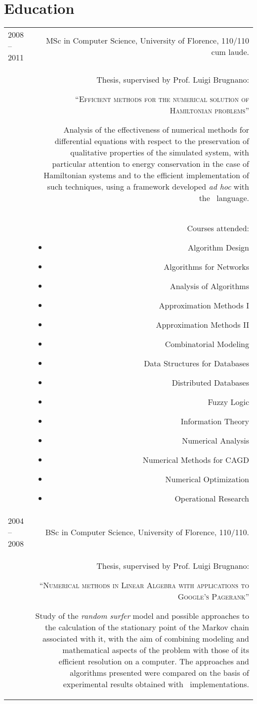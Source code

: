 \documentclass[10pt]{article}
\begin{document}
\section*{Education}
\begin{longtable}{L!{\VRule}R}
2008 -- 2011 & MSc in Computer Science, University of Florence, 110/110 cum laude.\\[5pt]
    & Thesis, supervised by Prof. Luigi Brugnano:
	\begin{center}``\textsc{Efficient methods for the numerical solution of Hamiltonian problems}''\end{center}
	Analysis of the effectiveness of numerical methods for differential equations with respect to the preservation
	of qualitative properties of the simulated system, with particular attention to energy conservation in the case
	of Hamiltonian systems and to the efficient implementation of such techniques, using a framework developed \emph{ad hoc}
	with the \clang\ language.\\[5pt]
    & Courses attended:
    \begin{multicols}{2}
    \begin{itemize}
        \item Algorithm Design
        \item Algorithms for Networks
        \item Analysis of Algorithms
   		\item Approximation Methods I
   		\item Approximation Methods II
        \item Combinatorial Modeling
        \item Data Structures for Databases
   		\item Distributed Databases
   		\item Fuzzy Logic
		\item Information Theory
		\item Numerical Analysis
		\item Numerical Methods for CAGD
		\item Numerical Optimization
		\item Operational Research
	\end{itemize}
    \end{multicols}\\[5pt]
2004 -- 2008 & BSc in Computer Science, University of Florence, 110/110.\\[5pt]
    & Thesis, supervised by Prof. Luigi Brugnano:
    \begin{center}``\textsc{Numerical methods in Linear Algebra with applications to Google's Pagerank}''\end{center}
	Study of the \emph{random surfer} model and possible approaches to the calculation of the stationary point of the Markov
	chain associated with it, with the aim of combining modeling and mathematical aspects of the problem with those of its efficient
	resolution on a computer. The approaches and algorithms presented were compared on the basis of experimental results obtained
	with \matlab\ implementations.
\end{longtable}
\end{document}
